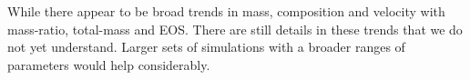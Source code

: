 While there appear to be broad trends in mass, composition and velocity with mass-ratio, total-mass and EOS. There are still details in these trends that we do not yet understand. Larger sets of simulations with a broader ranges of parameters would help considerably. 

\begin{table*}\centering

\end{table*}

